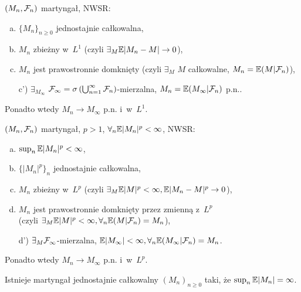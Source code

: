 



	\begin{theorem}[zbieżność w~$L^1$]
		$(M_n, \mathcal{F}_n)$ martyngał, NWSR:
		\begin{enumerate}[a)]
			\item $\{ M_n \}_{n \geq 0}$ jednostajnie całkowalna,
			\item $M_n$ zbieżny w~$L^1$
			(czyli $\exists_M \mathbb{E} |M_n - M| \to 0$),
			\item $M_n$ jest prawostronnie domknięty
			(czyli $\exists_M$ $M$ całkowalne, 
			$M_n = \mathbb{E}(M | \mathcal{F}_n)$),
			\item[c')] $\exists_{M_\infty}$ 
			$\mathcal{F}_\infty=\sigma\left( \bigcup_{n=1}^\infty \mathcal{F}_n \right)
			$-mierzalna, 
			$M_n = \mathbb{E} (M_\infty | \mathcal{F}_n)$ p.n..
		\end{enumerate}
		
		Ponadto wtedy $M_n \to M_\infty$ p.n. i~w~$L^1$.

	\end{theorem}
	
	\begin{theorem}[zbieżność w~$L^p$]
		$(M_n, \mathcal{F}_n)$ martyngał, $p>1$, $\forall_n \mathbb{E} |M_n|^p < \infty$,
		NWSR:
		\begin{enumerate}[a)]
			\item $\sup_n \mathbb{E} |M_n|^p < \infty$,
			\item $\{|M_n|^p\}_n$ jednostajnie całkowalna,
			\item $M_n$ zbieżny w~$L^p$ 
			(czyli $\exists_M \mathbb{E} |M|^p < \infty, \mathbb{E} |M_n - M|^p \to 0$),
			\item $M_n$ jest prawostronnie domknięty
			przez zmienną z~$L^p$
			\\ (czyli $\exists_M \mathbb{E} |M|^p < \infty, 
			\forall_n \mathbb{E}(M | \mathcal{F}_n) = M_n$),
			\item[d')] $\exists_M \mathcal{F}_\infty$-mierzalna, 
			$\mathbb{E} |M_\infty| < \infty,
			\forall_n \mathbb{E} (M_\infty | \mathcal{F}_n) = M_n$.

		\end{enumerate}
		
		Ponadto wtedy $M_n \to M_\infty$ p.n. i~w~$L^p$.

	\end{theorem}
	
	\begin{remark}
		Istnieje martyngał jednostajnie całkowalny $(M_n)_{n \geq 0}$ 
		taki, że $\sup_n \mathbb{E} |M_n| = \infty$.
	\end{remark}
	
